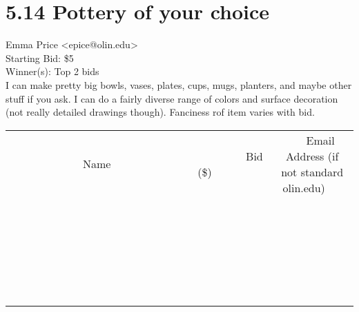 \documentclass[11pt]{article}
\begin{document}
					\section*{5.14 Pottery of your choice}
					Emma Price <epice@olin.edu> \\
					Starting Bid: \$5 \\
					Winner(s): Top 2 bids \\
					I can make pretty big bowls, vases, plates, cups, mugs, planters, and maybe other stuff if you ask. I can do a fairly diverse range of colors and surface decoration (not really detailed drawings though). Fanciness rof item varies with bid. \\
					[6ex]
					\begin{tabular}{c c c}
						~~~~~~~~~~~~~Name~~~~~~~~~~~~~ & ~~~~~~~~~Bid (\$)~~~~~~~~~ & ~~~Email Address (if not standard olin.edu)~~~ \\
				
 & & \\
\hline
 & & \\
\hline
 & & \\
\hline
 & & \\
\hline
 & & \\
\hline
 & & \\
\hline
 & & \\
\hline
 & & \\
\hline
 & & \\
\hline
 & & \\
\hline
 & & \\
\hline
 & & \\
\hline
 & & \\
\hline
 & & \\
\hline
 & & \\
\hline
 & & \\
\hline
 & & \\
\hline
 & & \\
\hline
 & & \\
\hline
 & & \\
\hline
 & & \\
\hline
 & & \\
\hline
 & & \\
\hline
 & & \\
\hline
 & & \\
\hline
 & & \\
\hline
					\end{tabular}
					\clearpage
				
\end{document}
